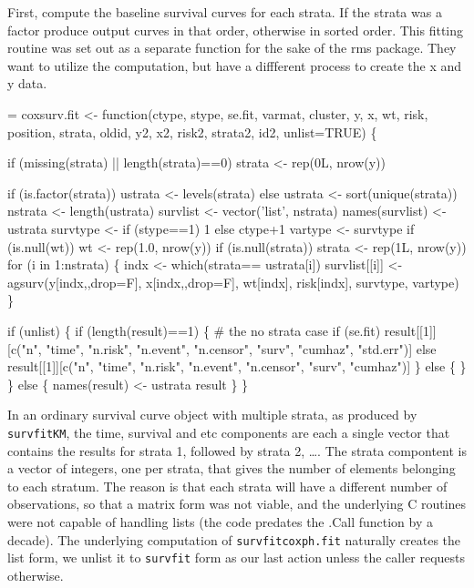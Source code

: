 \documentclass{article}
\newcommand{\code}[1]{\texttt{#1}}
\begin{document}
First, compute the baseline survival curves for each strata.  If the strata
was a factor produce output curves in that order, otherwise in sorted order.
This fitting routine was set out as a separate function for the sake of the rms
package.  They want to utilize the computation, but have a diffferent 
process to create the x and y data. 
\begin{nwchunk}
=
 coxsurv.fit <- function(ctype, stype, se.fit, varmat, cluster, 
                          y, x, wt, risk, position, strata, oldid,
                          y2, x2, risk2, strata2, id2, unlist=TRUE) \{
 
     if (missing(strata) || length(strata)==0) strata <- rep(0L, nrow(y))
 
     if (is.factor(strata)) ustrata <- levels(strata)
     else                   ustrata <- sort(unique(strata))
     nstrata <- length(ustrata)
     survlist <- vector('list', nstrata)
     names(survlist) <- ustrata
     survtype <- if (stype==1) 1 else ctype+1
     vartype <- survtype
     if (is.null(wt)) wt <- rep(1.0, nrow(y))
     if (is.null(strata)) strata <- rep(1L, nrow(y))
     for (i in 1:nstrata) \{
         indx <- which(strata== ustrata[i])
         survlist[[i]] <- agsurv(y[indx,,drop=F], x[indx,,drop=F], 
                                 wt[indx], risk[indx],
                                 survtype, vartype)
         \}
 
     if (unlist) \{
         if (length(result)==1) \{ # the no strata case
             if (se.fit)
                 result[[1]][c("n", "time", "n.risk", "n.event", "n.censor",
                           "surv", "cumhaz", "std.err")]
             else result[[1]][c("n", "time", "n.risk", "n.event", "n.censor",
                           "surv", "cumhaz")]
         \}
         else \{
         \} 
     \}
     else \{
         names(result) <- ustrata
         result
     \}
 \}    
\end{nwchunk}

In an ordinary survival curve object with multiple strata, as produced by
\code{survfitKM}, the time, survival and etc components are each a
single vector that contains the results for strata 1, followed by
strata 2, \ldots.  The strata compontent is a vector of integers, one
per strata, that gives the number of elements belonging to each stratum.
The reason is that each strata will have a different number of observations,
so that a matrix form was not viable, and the underlying C routines were
not capable of handling lists (the code predates the .Call function by 
a decade).  
The underlying computation of \code{survfitcoxph.fit} naturally creates the list
form, we unlist it to \code{survfit} form as our last action unless the 
caller requests otherwise.
\end{document}
